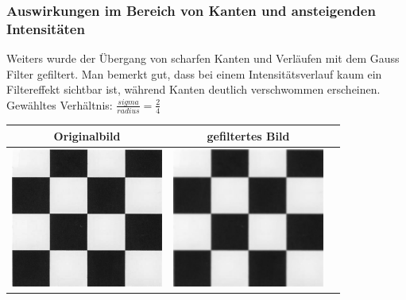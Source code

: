 \documentclass[12pt,german]{article}
\begin{document}
\subsubsection{Auswirkungen im Bereich von Kanten und ansteigenden Intensitäten}
Weiters wurde der Übergang von scharfen Kanten und Verläufen mit dem Gauss Filter gefiltert. Man bemerkt gut, dass bei einem Intensitätsverlauf kaum ein Filtereffekt sichtbar ist, während Kanten deutlich verschwommen erscheinen. Gewähltes Verhältnis: $ \frac{sigma}{radius} = \frac{2}{4} $
\begin{table}[H]
  \centering
  \begin{tabular}{| c | c | c |}
    \hline
    Originalbild & gefiltertes Bild \\
    \hline
	\includegraphics[width=5cm]{../testData/Gauss/Schachbrett.jpg} & 	\includegraphics[width=5cm]{../testData/Gauss/SchachbrettR4S2.jpg} \\
	\hline

\end{tabular}
\end{table}
\end{document}
